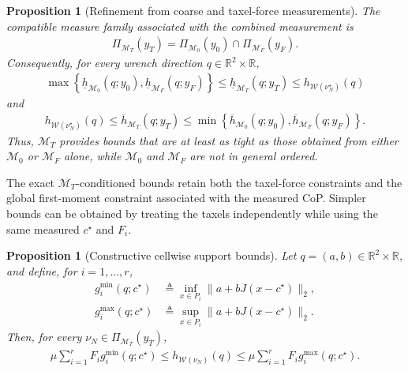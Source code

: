 \documentclass[11pt,a4paper]{article}
\theoremstyle{proposition}
\newtheorem{proposition}[theorem]{Proposition}
\begin{document}
\begin{proposition}[Refinement from coarse and taxel-force measurements]
\label{prop:taxel_refinement}
The compatible measure family associated with the combined measurement is
\begin{align}
\Pi_{\mathcal M_T}(y_T)
=
\Pi_{\mathcal M_0}(y_0)
\cap
\Pi_{\mathcal M_F}(y_F).
\end{align}
Consequently, for every wrench direction
$q\in\mathbb R^2\times\mathbb R$,
\begin{align}
\boxed{
\max\left\{
\underline h_{\mathcal M_0}(q;y_0),
\underline h_{\mathcal M_F}(q;y_F)
\right\}
\le
\underline h_{\mathcal M_T}(q;y_T)
\le
h_{\mathcal W(\nu_N^\star)}(q)
}
\end{align}
and
\begin{align}
\boxed{
h_{\mathcal W(\nu_N^\star)}(q)
\le
\overline h_{\mathcal M_T}(q;y_T)
\le
\min\left\{
\overline h_{\mathcal M_0}(q;y_0),
\overline h_{\mathcal M_F}(q;y_F)
\right\}.
}
\end{align}
Thus, $\mathcal M_T$ provides bounds that are at least as tight as those
obtained from either $\mathcal M_0$ or $\mathcal M_F$ alone, while
$\mathcal M_0$ and $\mathcal M_F$ are not in general ordered.
\end{proposition}

The exact $\mathcal M_T$-conditioned bounds retain both the taxel-force
constraints and the global first-moment constraint associated with the measured
CoP. Simpler bounds can be obtained by treating the taxels independently while
using the same measured $c^\star$ and $F_i$.

\begin{proposition}[Constructive cellwise support bounds]
Let $q=(a,b)\in\mathbb R^2\times\mathbb R$, and define, for
$i=1,\ldots,r$,
\begin{align}
g_i^{\min}(q;c^\star)
&\triangleq
\inf_{x\in P_i}
\|a+bJ(x-c^\star)\|_2,\\
g_i^{\max}(q;c^\star)
&\triangleq
\sup_{x\in P_i}
\|a+bJ(x-c^\star)\|_2.
\end{align}
Then, for every $\nu_N\in\Pi_{\mathcal M_T}(y_T)$,
\begin{align}
\boxed{
\mu\sum_{i=1}^r
F_i g_i^{\min}(q;c^\star)
\le
h_{\mathcal W(\nu_N)}(q)
\le
\mu\sum_{i=1}^r
F_i g_i^{\max}(q;c^\star).
}
\end{align}
\end{proposition}
\end{document}
